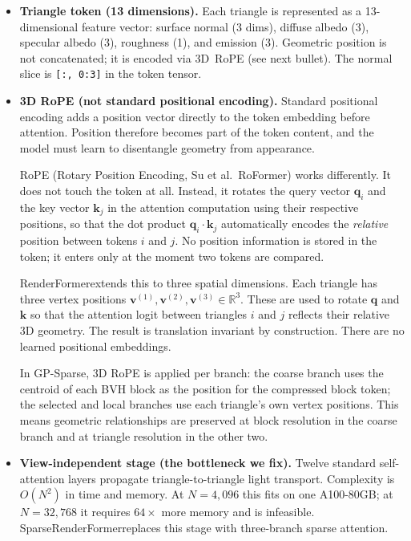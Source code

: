 \documentclass[11pt,letterpaper]{article}
\newcommand{\ours}{SparseRenderFormer}
\newcommand{\RF}{RenderFormer}
\newcommand{\code}[1]{\texttt{#1}}
\begin{document}
\begin{itemize}

  \item \textbf{Triangle token (13 dimensions).}
    Each triangle is represented as a 13-dimensional feature vector:
    surface normal (3 dims), diffuse albedo (3), specular albedo (3),
    roughness (1), and emission (3).
    Geometric position is not concatenated; it is encoded via 3D~RoPE
    (see next bullet).
    The normal slice is \code{[:, 0:3]} in the token tensor.

  \item \textbf{3D RoPE (not standard positional encoding).}
    Standard positional encoding adds a position vector directly to the
    token embedding before attention.
    Position therefore becomes part of the token content, and the model
    must learn to disentangle geometry from appearance.

    RoPE (Rotary Position Encoding, Su et al.\ RoFormer) works differently.
    It does not touch the token at all.
    Instead, it rotates the query vector $\mathbf{q}_i$ and the key vector
    $\mathbf{k}_j$ in the attention computation using their respective
    positions, so that the dot product $\mathbf{q}_i \cdot \mathbf{k}_j$
    automatically encodes the \emph{relative} position between tokens $i$
    and $j$.
    No position information is stored in the token; it enters only at the
    moment two tokens are compared.

    \RF extends this to three spatial dimensions.
    Each triangle has three vertex positions
    $\mathbf{v}^{(1)}, \mathbf{v}^{(2)}, \mathbf{v}^{(3)} \in \mathbb{R}^3$.
    These are used to rotate $\mathbf{q}$ and $\mathbf{k}$ so that the
    attention logit between triangles $i$ and $j$ reflects their relative
    3D geometry.
    The result is translation invariant by construction.
    There are no learned positional embeddings.

    In GP-Sparse, 3D RoPE is applied per branch:
    the coarse branch uses the centroid of each BVH block as the position
    for the compressed block token; the selected and local branches use
    each triangle's own vertex positions.
    This means geometric relationships are preserved at block resolution
    in the coarse branch and at triangle resolution in the other two.

  \item \textbf{View-independent stage (the bottleneck we fix).}
    Twelve standard self-attention layers propagate triangle-to-triangle
    light transport.
    Complexity is $O(N^2)$ in time and memory.
    At $N = 4{,}096$ this fits on one A100-80GB; at $N = 32{,}768$ it
    requires $64\times$ more memory and is infeasible.
    \ours replaces this stage with three-branch sparse attention.


\end{itemize}
\end{document}
